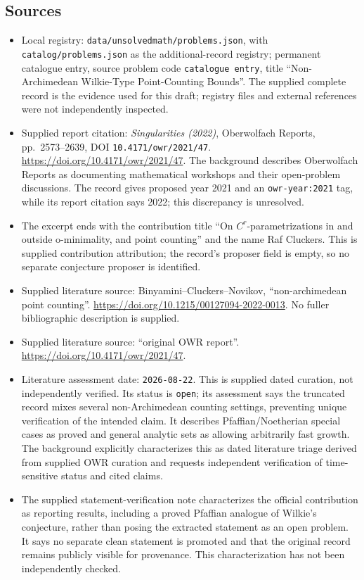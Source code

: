 \documentclass[11pt]{article}
\begin{document}
\subsection{Sources}
\begin{itemize}
\item Local registry: \texttt{data/unsolvedmath/problems.json}, with \texttt{catalog/problems.json} as the additional-record registry; permanent catalogue entry, source problem code \texttt{catalogue entry}, title ``Non-Archimedean Wilkie-Type Point-Counting Bounds''. The supplied complete record is the evidence used for this draft; registry files and external references were not independently inspected.
\item Supplied report citation: \emph{Singularities (2022)}, Oberwolfach Reports, pp.\ 2573--2639, DOI \texttt{10.4171/owr/2021/47}. \url{https://doi.org/10.4171/owr/2021/47}. The background describes Oberwolfach Reports as documenting mathematical workshops and their open-problem discussions. The record gives proposed year 2021 and an \texttt{owr-year:2021} tag, while its report citation says 2022; this discrepancy is unresolved.
\item The excerpt ends with the contribution title ``On \(C^r\)-parametrizations in and outside o-minimality, and point counting'' and the name Raf Cluckers. This is supplied contribution attribution; the record's proposer field is empty, so no separate conjecture proposer is identified.
\item Supplied literature source: Binyamini--Cluckers--Novikov, ``non-archimedean point counting''. \url{https://doi.org/10.1215/00127094-2022-0013}. No fuller bibliographic description is supplied.
\item Supplied literature source: ``original OWR report''. \url{https://doi.org/10.4171/owr/2021/47}.
\item Literature assessment date: \texttt{2026-08-22}. This is supplied dated curation, not independently verified. Its status is \texttt{open}; its assessment says the truncated record mixes several non-Archimedean counting settings, preventing unique verification of the intended claim. It describes Pfaffian/Noetherian special cases as proved and general analytic sets as allowing arbitrarily fast growth. The background explicitly characterizes this as dated literature triage derived from supplied OWR curation and requests independent verification of time-sensitive status and cited claims.
\item The supplied statement-verification note characterizes the official contribution as reporting results, including a proved Pfaffian analogue of Wilkie's conjecture, rather than posing the extracted statement as an open problem. It says no separate clean statement is promoted and that the original record remains publicly visible for provenance. This characterization has not been independently checked.
\end{itemize}
\end{document}

